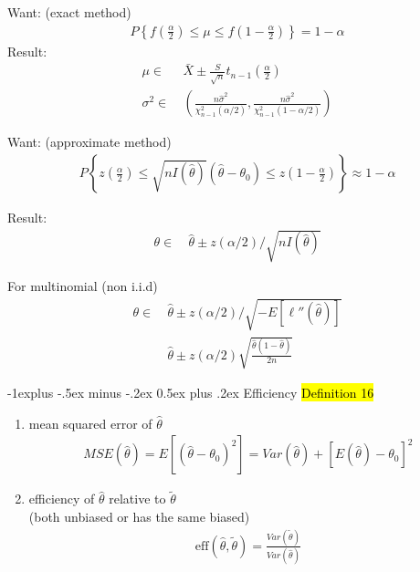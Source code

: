 \documentclass[a4paper,12pt,landscape]{article}
\makeatletter
\renewcommand{\subsection}{\@startsection{subsection}{2}{0mm}%
                                {-1explus -.5ex minus -.2ex}%
                                {0.5ex plus .2ex}%
                                {\normalfont\normalsize\bfseries\color{blue}}}
\makeatother
\begin{document}
\begin{multicols}{3}
Want: (exact method)
\begin{align*}
    P\left\{ f(\frac{\alpha}{2}) \leq \mu \leq f(1-\frac{\alpha}{2})  \right\} = 1-\alpha
\end{align*}
Result:
\begin{align*}
    \mu \in & ~\bar X \pm \frac{S}{\sqrt{n}}t_{n-1}(\frac{\alpha}{2})\\
    \sigma^2 \in &~ \left( \frac{n\hat\sigma^2}{\chi^2_{n-1}(\alpha/2)}, \frac{n\hat\sigma^2}{\chi^2_{n-1}(1-\alpha/2)}  \right)
\end{align*}

Want: (approximate method)
\begin{align*}
    P\left\{ z(\frac{\alpha}{2}) \leq \sqrt{nI(\hat\theta)}(\hat\theta - \theta_0) \leq z(1-\frac{\alpha}{2})  \right\} \approx 1 - \alpha
\end{align*}

Result:
\begin{align*}
    \theta \in & ~\hat\theta \pm {z(\alpha/2)}/{\sqrt{nI(\hat\theta)}}
\end{align*}

For multinomial (non i.i.d)
\begin{align*}
    \theta \in & ~ \hat\theta \pm z(\alpha/2)/\sqrt{-E[\ell''(\hat\theta)]}\\
               & ~ \hat\theta \pm z(\alpha/2)\sqrt{\frac{\hat\theta(1-\hat\theta)}{2n}}
\end{align*}

\subsection{Efficiency}
\hl{Definition 16}
\begin{enumerate}
    \item mean squared error of $\hat\theta$
        \begin{align*}
            MSE(\hat\theta) = E[(\hat\theta - \theta_0)^2] = Var(\hat\theta) + [E(\hat\theta)-\theta_0]^2
        \end{align*}
    \item efficiency of $\hat\theta$ relative to $\tilde\theta$ \\ (both unbiased or has the same biased)
        \begin{align*}
            \text{eff}(\hat\theta, \tilde\theta) = \frac{Var(\tilde\theta)}{Var(\hat\theta)}
        \end{align*}
\end{enumerate}


\end{multicols}
\end{document}
